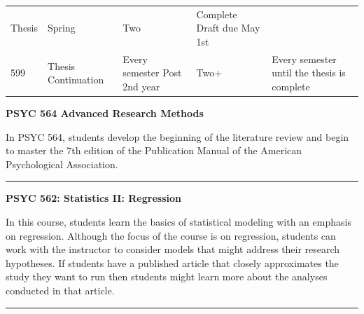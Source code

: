 \documentclass[openany]{book}
\begin{document}
\begin{longtable}[]{@{}lllll@{}}
\begin{minipage}[t]{0.27\columnwidth}
Thesis\strut
\end{minipage} & \begin{minipage}[t]{0.26\columnwidth}\raggedright
Spring\strut
\end{minipage} & \begin{minipage}[t]{0.10\columnwidth}\raggedright
Two\strut
\end{minipage} & \begin{minipage}[t]{0.19\columnwidth}\raggedright
Complete Draft due May 1st\strut
\end{minipage}\tabularnewline
\begin{minipage}[t]{0.03\columnwidth}\raggedright
599\strut
\end{minipage} & \begin{minipage}[t]{0.27\columnwidth}\raggedright
Thesis Continuation\strut
\end{minipage} & \begin{minipage}[t]{0.26\columnwidth}\raggedright
Every semester Post 2nd year\strut
\end{minipage} & \begin{minipage}[t]{0.10\columnwidth}\raggedright
Two+\strut
\end{minipage} & \begin{minipage}[t]{0.19\columnwidth}\raggedright
Every semester until the thesis is complete\strut
\end{minipage}\tabularnewline
\bottomrule
\end{longtable}

\textbf{PSYC 564 Advanced Research Methods}

In PSYC 564, students develop the beginning of the literature review and begin to master the 7th edition of the Publication Manual of the American Psychological Association.

\begin{center}\rule{0.5\linewidth}{0.5pt}\end{center}

\textbf{PSYC 562: Statistics II: Regression}

In this course, students learn the basics of statistical modeling with an emphasis on regression. Although the focus of the course is on regression, students can work with the instructor to consider models that might address their research hypotheses. If students have a published article that closely approximates the study they want to run then students might learn more about the analyses conducted in that article.

\begin{center}\rule{0.5\linewidth}{0.5pt}\end{center}
\end{document}
